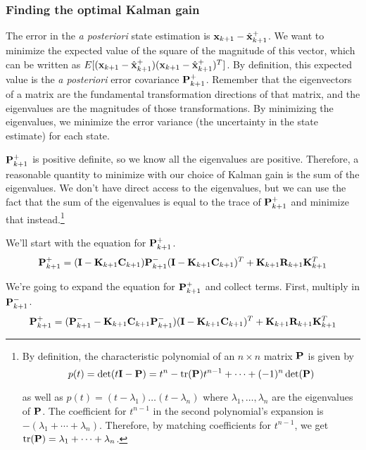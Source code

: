 \subsubsection{Finding the optimal Kalman gain}

The error in the \textit{a posteriori} \gls{state} estimation is
$\mathbf{x}_{k+1} - \hat{\mathbf{x}}_{k+1}^+$. We want to minimize the expected value
of the square of the magnitude of this vector, which can be written as
$E[(\mathbf{x}_{k+1} - \hat{\mathbf{x}}_{k+1}^+)(\mathbf{x}_{k+1} - \hat{\mathbf{x}}_{k+1}^+)^T]$.
By definition, this expected value is the \textit{a posteriori} error covariance
$\mathbf{P}_{k+1}^+$. Remember that the eigenvectors of a matrix are the
fundamental transformation directions of that matrix, and the eigenvalues are
the magnitudes of those transformations. By minimizing the eigenvalues, we
minimize the error variance (the uncertainty in the state estimate) for each
state.

$\mathbf{P}_{k+1}^+$ is positive definite, so we know all the eigenvalues are
positive. Therefore, a reasonable quantity to minimize with our choice of Kalman
gain is the sum of the eigenvalues. We don't have direct access to the
eigenvalues, but we can use the fact that the sum of the eigenvalues is equal to
the trace of $\mathbf{P}_{k+1}^+$ and minimize that instead.\footnote{By
definition, the characteristic polynomial of an $n \times n$ matrix $\mathbf{P}$ is
given by
\begin{equation*}
  p(t) = \det(t\mathbf{I} - \mathbf{P}) = t^n - \operatorname{tr}(\mathbf{P}) t^{n-1} + \cdots +
    (-1)^n \det(\mathbf{P})
\end{equation*}

as well as $p(t) = (t - \lambda_1) \ldots (t - \lambda_n)$ where
$\lambda_1, \ldots, \lambda_n$ are the eigenvalues of $\mathbf{P}$. The coefficient
for $t^{n-1}$ in the second polynomial's expansion is
$-(\lambda_1 + \cdots + \lambda_n)$. Therefore, by matching coefficients for
$t^{n-1}$, we get $\operatorname{tr}(\mathbf{P}) = \lambda_1 + \cdots + \lambda_n$.}

We'll start with the equation for $\mathbf{P}_{k+1}^+$.
\begin{equation*}
  \mathbf{P}_{k+1}^+ = (\mathbf{I} - \mathbf{K}_{k+1}\mathbf{C}_{k+1})\mathbf{P}_{k+1}^-
    (\mathbf{I} - \mathbf{K}_{k+1}\mathbf{C}_{k+1})^T + \mathbf{K}_{k+1}\mathbf{R}_{k+1}
    \mathbf{K}_{k+1}^T
\end{equation*}

We're going to expand the equation for $\mathbf{P}_{k+1}^+$ and collect terms.
First, multiply in $\mathbf{P}_{k+1}^-$.
\begin{equation*}
  \mathbf{P}_{k+1}^+ =
    (\mathbf{P}_{k+1}^- - \mathbf{K}_{k+1}\mathbf{C}_{k+1}\mathbf{P}_{k+1}^-)
    (\mathbf{I} - \mathbf{K}_{k+1}\mathbf{C}_{k+1})^T + \mathbf{K}_{k+1}\mathbf{R}_{k+1}
    \mathbf{K}_{k+1}^T
\end{equation*}

